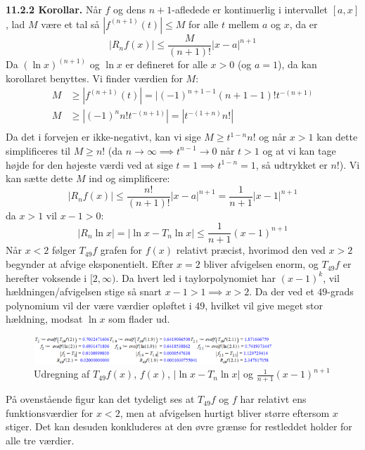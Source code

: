 \documentclass{report}
\begin{document}
\textbf{11.2.2 Korollar. }Når $f$ og dens $n+1$-afledede er kontinuerlig i intervallet $[a,x]$, lad $M$ være et tal så $|f^{(n+1)}(t)|\leq M$ for alle $t$ mellem $a$ og $x$, da er\begin{equation}
    |R_nf(x)|\leq\frac{M}{(n+1)!}|x-a|^{n+1}
\end{equation}{}
Da $(\ln{x})^{(n+1)}$ og $\ln{x}$ er defineret for alle $x>0$ (og $a=1$), da kan korollaret benyttes. Vi finder værdien for $M$: \begin{align*}
    M&\geq|f^{(n+1)}(t)|=|(-1)^{n+1-1}(n+1-1)!t^{-(n+1)}\\
    M&\geq|(-1)^n n!t^{-(n+1)}|=|t^{-(1+n)}n!|\\
\end{align*}Da det i forvejen er ikke-negativt, kan vi sige $M\geq t^{1-n}n!$ og når $x>1$ kan dette simplificeres til $M\geq n!$ (da $n\to\infty\implies t^{n-1}\to0$ når $t>1$ og at vi kan tage højde for den højeste værdi ved at sige $t=1\implies t^{1-n}=1$, så udtrykket er $n!$). Vi kan sætte dette $M$ ind og simplificere:
$$|R_nf(x)|\leq\frac{n!}{(n+1)!}|x-a|^{n+1}=\frac{1}{n+1}|x-1|^{n+1}$$da $x>1$ vil $x-1>0$:
\begin{equation}
|R_n\ln{x}|=|\ln{x}-T_n\ln{x}|\leq\frac{1}{n+1}(x-1)^{n+1}
\end{equation}
Når $x<2$ følger $T_{49}f$ grafen for $f(x)$ relativt præcist, hvorimod den ved $x>2$ begynder at afvige eksponentielt. Efter $x=2$ bliver afvigelsen enorm, og $T_{49}f$ er herefter voksende i $[2,\infty)$. Da hvert led i taylorpolynomiet har $(x-1)^k$, vil hældningen/afvigelsen stige så snart $x-1>1\implies x>2$. Da der ved et $49$-grads polynomium vil der være værdier opløftet i $49$, hvilket vil give meget stor hældning, modsat $\ln{x}$ som flader ud.
\begin{figure}[H]
    \centering
    \includegraphics[width=0.8\textwidth]{33b.png}
    \caption{Udregning af $T_{49}f(x)$, $f(x)$, $|\ln{x}-T_n\ln{x}|$ og $\frac{1}{n+1}(x-1)^{n+1}$}
\end{figure}{}
På ovenstående figur kan det tydeligt ses at $T_{49}f$ og $f$ har relativt ens funktionsværdier for $x<2$, men at afvigelsen hurtigt bliver større eftersom $x$ stiger. Det kan desuden konkluderes at den øvre grænse for restleddet holder for alle tre værdier. 
\end{document}
